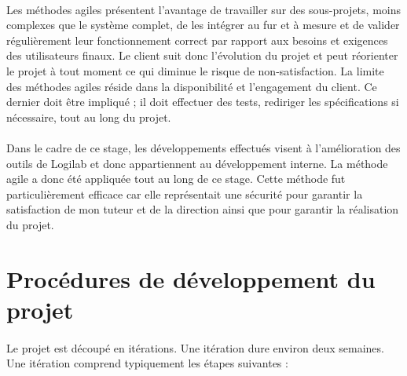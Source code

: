 \documentclass {report}
\begin{document}
\paragraph{}
Les méthodes agiles présentent l’avantage de travailler sur des sous-projets, moins complexes que le système complet, de les intégrer au fur et à mesure et de valider régulièrement leur fonctionnement correct par rapport aux besoins et exigences des utilisateurs finaux. Le client suit donc l'évolution du projet et peut réorienter le projet à tout moment ce qui diminue le risque de non-satisfaction. La limite des méthodes agiles réside dans la disponibilité et l'engagement du client. Ce dernier doit être impliqué ; il doit effectuer des tests, rediriger les spécifications si nécessaire, tout au long du projet.

\paragraph{}
Dans le cadre de ce stage, les développements effectués visent à l'amélioration des outils de Logilab et donc appartiennent au développement interne. La méthode agile a donc été appliquée tout au long de ce stage. Cette méthode fut particulièrement efficace car elle représentait une sécurité pour garantir la satisfaction de mon tuteur et de la direction ainsi que pour garantir la réalisation du projet. 

\section{Procédures de développement du projet}
\paragraph{}
Le projet est découpé en itérations. Une itération dure environ deux semaines. Une itération comprend typiquement les étapes suivantes :
\end{document}
